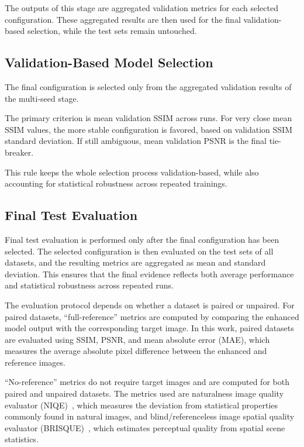 The outputs of this stage are aggregated validation metrics for each selected configuration. These aggregated results are then used for the final validation-based selection, while the test sets remain untouched.

\subsection{Validation-Based Model Selection}

The final configuration is selected only from the aggregated validation results of the multi-seed stage.

The primary criterion is mean validation SSIM across runs. For very close mean SSIM values, the more stable configuration is favored, based on validation SSIM standard deviation. If still ambiguous, mean validation PSNR is the final tie-breaker.

This rule keeps the whole selection process validation-based, while also accounting for statistical robustness across repeated trainings.

\subsection{Final Test Evaluation}

Final test evaluation is performed only after the final configuration has been selected. The selected configuration is then evaluated on the test sets of all datasets, and the resulting metrics are aggregated as mean and standard deviation. This ensures that the final evidence reflects both average performance and statistical robustness across repeated runs.

The evaluation protocol depends on whether a dataset is paired or unpaired. For paired datasets, ``full-reference'' metrics are computed by comparing the enhanced model output with the corresponding target image. In this work, paired datasets are evaluated using SSIM, PSNR, and mean absolute error (MAE), which measures the average absolute pixel difference between the enhanced and reference images.

``No-reference'' metrics do not require target images and are computed for both paired and unpaired datasets. The metrics used are naturalness image quality evaluator (NIQE)~\cite{DBLP:journals/spl/MittalSB13}, which measures the deviation from statistical properties commonly found in natural images, and blind/referenceless image spatial quality evaluator (BRISQUE)~\cite{DBLP:journals/tip/MittalMB12}, which estimates perceptual quality from spatial scene statistics.

